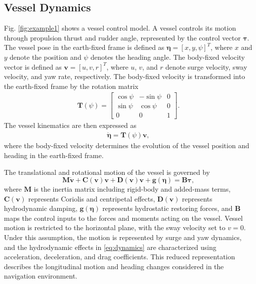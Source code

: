 \documentclass[final,5p,times,twocolumn]{elsarticle}
\begin{document}
\subsection{Vessel Dynamics}
{\color{violet}
Fig. \ref{fig:example1} shows a vessel control model. A vessel controls its motion through propulsion thrust and rudder angle, represented by the control vector $\boldsymbol{\tau}$. The vessel pose in the earth-fixed frame is defined as $\boldsymbol{\eta}=[x,y,\psi]^T$, where $x$ and $y$ denote the position and $\psi$ denotes the heading angle. The body-fixed velocity vector is defined as $\boldsymbol{v}=[u,v,r]^T$, where $u$, $v$, and $r$ denote surge velocity, sway velocity, and yaw rate, respectively.
The body-fixed velocity is transformed into the earth-fixed frame by the rotation matrix
\begin{align}
\mathbf{T}(\psi)
=\begin{bmatrix}
\cos\psi & -\sin\psi & 0 \\
\sin\psi & \cos\psi & 0 \\
0 & 0 & 1
\end{bmatrix}.
\label{eq:T}
\end{align}
The vessel kinematics are then expressed as
\begin{align}
\dot{\boldsymbol{\eta}}
=\mathbf{T}(\psi)\boldsymbol{v},
\label{eq:kinematics}
\end{align}
where the body-fixed velocity determines the evolution of the vessel position and heading in the earth-fixed frame.

The translational and rotational motion of the vessel is governed by
\begin{equation}
\mathbf{M}\dot{\boldsymbol{v}}
+
\mathbf{C}(\boldsymbol{v})\boldsymbol{v}
+
\mathbf{D}(\boldsymbol{v})\boldsymbol{v}
+
\mathbf{g}(\boldsymbol{\eta})
=
\mathbf{B}\boldsymbol{\tau},
\label{eq:dynamics}
\end{equation}
where $\mathbf{M}$ is the inertia matrix including rigid-body and added-mass terms, $\mathbf{C}(\boldsymbol{v})$ represents Coriolis and centripetal effects, $\mathbf{D}(\boldsymbol{v})$ represents hydrodynamic damping, $\mathbf{g}(\boldsymbol{\eta})$ represents hydrostatic restoring forces, and $\mathbf{B}$ maps the control inputs to the forces and moments acting on the vessel.
Vessel motion is restricted to the horizontal plane, with the sway velocity set to $v=0$. Under this assumption, the motion is represented by surge and yaw dynamics, and the hydrodynamic effects in \eqref{eq:dynamics} are characterized using acceleration, deceleration, and drag coefficients. This reduced representation describes the longitudinal motion and heading changes considered in the navigation environment.


}
\end{document}
